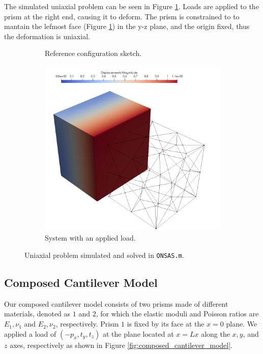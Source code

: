 \documentclass[oneside,a4paper,english,links]{amca}
\begin{document}
The simulated uniaxial problem can be seen in Figure \ref{fig:uniaxial_model}. Loads are applied to the prism at the right end, causing it to deform. The prism is constrained to to mantain the lefmost face (Figure \ref{fig:uniaxial_model}) in the y-z plane, and the origin fixed, thus the deformation is uniaxial.

\begin{figure}[ht]
	\centering
	\begin{subfigure}[b]{0.48\textwidth}
	\def\svgwidth{\textwidth}
	
	\caption{Reference configuration sketch.}
	\end{subfigure}
	\hfill
	\begin{subfigure}[b]{0.48\textwidth}
	\centering
		\includegraphics[width=\textwidth]{Figures/Example1.png}
	\caption{System with an applied load.}
	\end{subfigure}
	\caption{Uniaxial problem simulated and solved in \texttt{ONSAS.m}.}
	\label{fig:uniaxial_model}
\end{figure}


\subsection{Composed Cantilever Model}
Our composed cantilever model consists of two prisms made of different materials, denoted as $1$ and $2$, for which the elastic moduli and Poisson ratios are $E_1, \nu_1$ and $E_2, \nu_2$, respectively. Prism $1$ is fixed by its face at the $x=0$ plane. We applied a load of $(-p_x, t_y, t_z)$ at the plane located at $x=Lx$ along the $x, y$, and $z$ axes, respectively as shown in Figure \ref{fig:composed_cantilever_model}.
\end{document}
